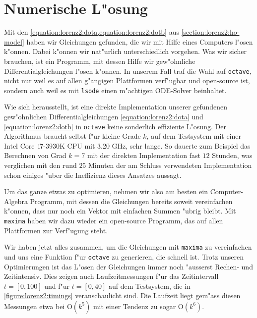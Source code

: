 \section{Numerische L"osung\label{section:lorenz2:numeric-solution}}
Mit den \cref{equation:lorenz2:dota,equation:lorenz2:dotb} aus 
\cref{section:lorenz2:ho-model} haben wir Gleichungen gefunden, die wir mit 
Hilfe eines Computers l"osen k"onnen. Dabei k"onnen wir nat"urlich 
unterschiedlich vorgehen. Was wir sicher brauchen, ist ein Programm, 
mit dessen Hilfe wir gew"ohnliche Differentialgleichungen l"osen k"onnen. In 
unserem Fall traf die Wahl auf \texttt{octave}, nicht nur weil es auf allen 
g"angigen Plattformen verf"ugbar und open-source ist, sondern auch weil es mit 
\texttt{lsode} einen m"achtigen  ODE-Solver beinhaltet.
%

Wie sich herausstellt, ist eine direkte Implementation unserer gefundenen 
gew"ohnlichen Differentialgleichungen \cref{equation:lorenz2:dota} und 
\cref{equation:lorenz2:dotb} in \texttt{octave} keine sonderlich effiziente 
%
L"osung. Der Algorithmus braucht selbst f"ur kleine Grade $k$, auf dem 
Testsystem mit einer Intel\textregistered{} Core\texttrademark\, i7-3930K CPU mit 
3.20 GHz, sehr lange. So dauerte zum Beispiel das Berechnen von Grad $k = 7$ 
mit der direkten Implementation fast $12$ Stunden, was verglichen mit den rund 
$25$ Minuten der am Schluss verwendeten Implementation schon einiges "uber 
die Ineffizienz dieses Ansatzes aussagt.

Um das ganze etwas zu optimieren, nehmen wir also am besten ein 
Computer-Algebra Programm, mit dessen die Gleichungen bereits soweit 
vereinfachen k"onnen, dass nur noch ein Vektor mit einfachen Summen "ubrig 
bleibt. Mit \texttt{maxima} haben wir dazu wieder ein open-source Programm, das 
%
auf allen Plattformen zur Verf"ugung steht.

Wir haben jetzt alles zusammen, um die Gleichungen mit \texttt{maxima} zu 
vereinfachen und uns eine Funktion f"ur \texttt{octave} zu generieren, die 
schnell ist. Trotz unseren Optimierungen ist das L"osen der 
Gleichungen immer noch "ausserst Rechen- und Zeitintensiv. Dies zeigen auch 
Laufzeitmessungen f"ur das Zeitintervall $t = [0,100]$ und f"ur $t = [0,40]$ 
auf dem Testsystem, die in \cref{figure:lorenz2:timings} veranschaulicht sind. 
Die Laufzeit liegt gem"ass diesen Messungen etwa bei $\text{O}(k^5)$ mit einer 
Tendenz zu sogar $\text{O}(k^6)$.

